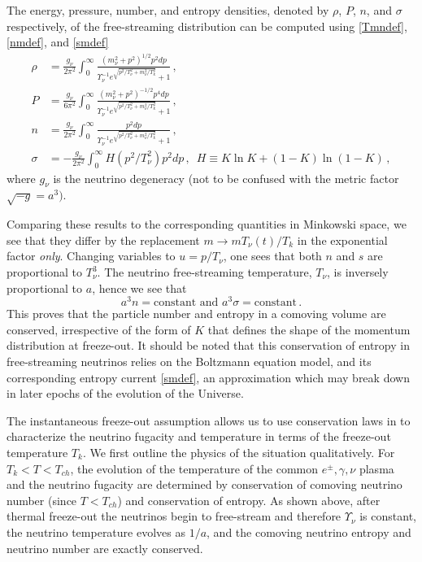 The energy, pressure, number, and entropy densities, denoted by $\rho$, $P$, $n$, and $\sigma$ respectively, of the free-streaming distribution  can be computed using \eqref{Tmndef}, \eqref{nmdef}, and \eqref{smdef}
\begin{align}
\rho&=\frac{g_\nu}{2\pi^2}\!\int_0^\infty\!\!\!\frac{\left(m_\nu^2+p^2\right)^{1/2}p^2dp }{\Upsilon_\nu^{-1}e^{\sqrt{p^2/T_\nu^2+m_\nu^2/T_k^2}}+ 1}\,,\label{eq:NeutrinoRho}\\[0.2cm]
P&=\frac{g_\nu}{6\pi^2}\!\int_0^\infty\!\!\!\frac{\left(m_\nu^2+p^2\right)^{-1/2}p^4dp }{\Upsilon_\nu^{-1} e^{\sqrt{p^2/T_\nu^2+m_\nu^2/T_k^2}}+ 1}\,,\label{eq:NeutrinoP}\\[0.2cm]
n&=\frac{g_\nu}{2\pi^2}\!\int_0^\infty\!\!\!\frac{p^2dp }{\Upsilon_\nu^{-1}e^{\sqrt{p^2/T_\nu^2+m_\nu^2/T_k^2}}+ 1}\,,\label{eq:NumDensity}\\[0.3cm]
\sigma&=-\frac{g_\nu}{2\pi^2}\!\int_0^\infty\!\!\!H(p^2/T_\nu^2)p^2dp\,,\,\,\,H\equiv K\ln K +(1-K)\ln(1-K)\,,\label{eq:EntropyIntegrand}
\end{align}
where $g_\nu$ is the neutrino degeneracy (not to be confused with the metric factor $\sqrt{-g}=a^3)$.

Comparing these results to the corresponding quantities in Minkowski space, we see that they differ by the replacement $m\rightarrow m T_\nu(t)/T_k$ in the exponential factor {\em only}. Changing variables to $u=p/T_\nu$, one sees that both $n$ and $s$ are proportional to $T_\nu^3$. The neutrino free-streaming temperature, $T_\nu$, is inversely proportional to $a$, hence we see that
\begin{equation}\label{eq:ConstEntropy}
a^3n=\text{constant}\text{ and } a^3\sigma=\text{constant}\,.
\end{equation}
This proves that the particle number and entropy in a comoving volume are conserved, irrespective of the form of $K$ that defines the shape of the momentum distribution at freeze-out. It should be noted that this conservation of entropy in free-streaming neutrinos relies on the Boltzmann equation model, and its corresponding entropy current \eqref{smdef}, an approximation which may break down in later epochs of the evolution of the Universe. 

The instantaneous freeze-out assumption allows us to use conservation laws in  to characterize the neutrino fugacity and temperature in terms of the freeze-out temperature $T_k$. We first outline the physics of the situation qualitatively. For $T_k<T<T_{ch}$, the evolution of the temperature of the common $e^\pm,\gamma,\nu$ plasma and the neutrino fugacity are determined by conservation of comoving neutrino number (since $T<T_{ch}$) and conservation of entropy. As shown above, after thermal freeze-out the neutrinos begin to free-stream and therefore $\Upsilon_\nu$ is constant, the neutrino temperature evolves as $1/a$, and the comoving neutrino entropy and neutrino number are exactly conserved. 

